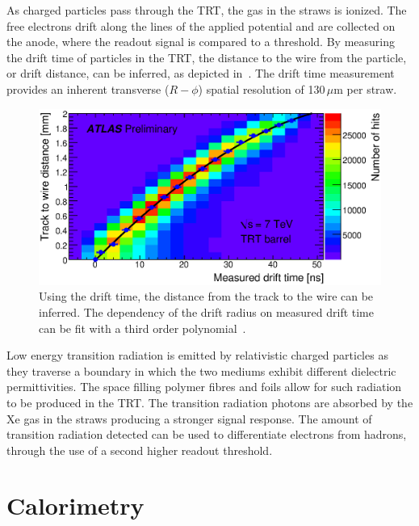 As charged particles pass through the TRT, the gas in the straws is ionized. The free electrons drift along the lines of the applied potential and are collected on the anode, where the readout signal is compared to a threshold.  By measuring the drift time of particles in the TRT, the distance to the wire from the particle, or drift distance, can be inferred, as depicted in~\Fig{\ref{fig:trt_drift}}. The drift time measurement provides an inherent transverse ($R-\phi$) spatial resolution of 130\,$\mu$m per straw.

\begin{figure}
\begin{center}
	\includegraphics[width=.99\linewidth]{figures/ATLAS/trt_drift}
	\caption[Transition Radiation Tracker wire impact parameter vs drift time]{Using the drift time, the distance from the track to the wire can be inferred. The dependency of the drift radius on measured drift time can be fit with a third order polynomial~\cite{trt_twiki}.}
	\label{fig:trt_drift}
\end{center}
\end{figure}

Low energy transition radiation is emitted by relativistic charged particles as they traverse a boundary in which the two mediums exhibit different dielectric permittivities. The space filling polymer fibres and foils allow for such radiation to be produced in the TRT. The transition radiation photons are absorbed by the Xe gas in the straws producing a stronger signal response. The amount of transition radiation detected can be used to differentiate
electrons from hadrons, through the use of a second higher readout threshold. 


\section{Calorimetry}

